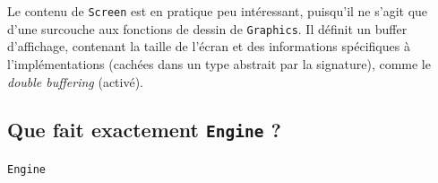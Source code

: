 \documentclass[a4paper]{scrartcl}
\begin{document}
Le contenu de \texttt{Screen} est en pratique peu intéressant,
puisqu'il ne s'agit que d'une surcouche aux fonctions de dessin de
\texttt{Graphics}. Il définit un buffer d'affichage, contenant la
taille de l'écran et des informations spécifiques à l'implémentations
(cachées dans un type abstrait par la signature), comme le
\emph{double buffering} (activé).

\subsection{Que fait exactement \texttt{Engine} ?}
\texttt{Engine}
\end{document}
